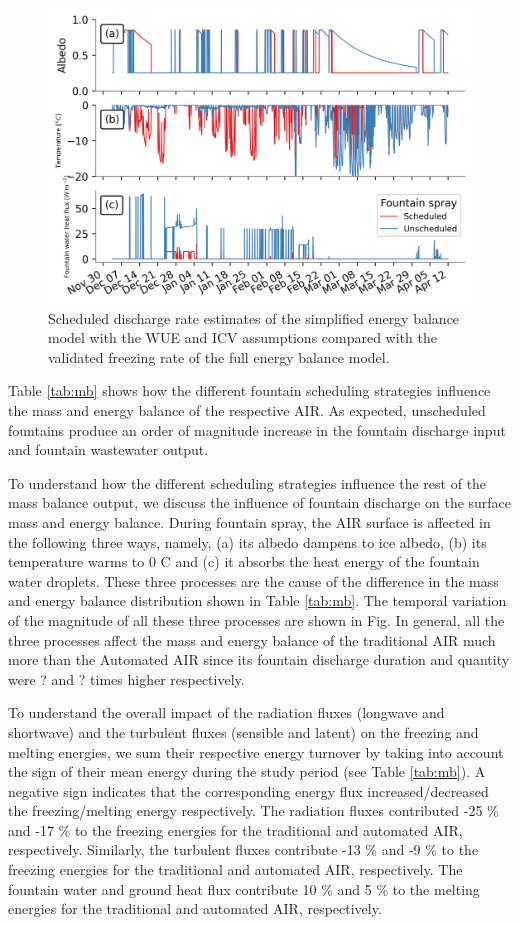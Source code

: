\documentclass[tc, manuscript]{copernicus}
\begin{document}
\begin{figure}[t]
\includegraphics[width=12cm]{Figures/dis_processes.png}
\caption{Scheduled discharge rate estimates of the simplified energy balance model with the WUE and ICV
assumptions compared with the validated freezing rate of the full energy balance model.}
\label{fig:freezing_rate}
\end{figure}

Table \ref{tab:mb} shows how the different fountain scheduling strategies influence the mass
and energy balance of the respective AIR. As expected, unscheduled fountains produce an order of magnitude
increase in the fountain discharge input and fountain wastewater output. 

To understand how the different scheduling strategies influence the rest of the mass balance output, we discuss
the influence of fountain discharge on the surface mass and energy balance. During fountain spray, the AIR
surface is affected in the following three ways, namely, (a) its albedo dampens to ice albedo, (b) its
temperature warms to 0 C and (c) it absorbs the heat energy of the fountain water droplets. These three
processes are the cause of the difference in the mass and energy balance distribution shown in Table
\ref{tab:mb}. The temporal variation of the magnitude of all these three processes are shown in Fig. In general,
all the three processes affect the mass and energy balance of the traditional AIR much more than the Automated
AIR since its fountain discharge duration and quantity were ? and ? times higher respectively. 

To understand the overall impact of the radiation fluxes (longwave and shortwave) and the turbulent fluxes
(sensible and latent) on the freezing and melting energies, we sum their respective energy turnover by taking
into account the sign of their mean energy during the study period (see Table \ref{tab:mb}). A negative sign
indicates that the corresponding energy flux increased/decreased the freezing/melting energy respectively.  The
radiation fluxes contributed -25 \% and -17 \% to the freezing energies for the traditional and automated AIR,
respectively.  Similarly, the turbulent fluxes contribute -13 \% and -9 \% to the freezing energies for the
traditional and automated AIR, respectively. The fountain water and ground heat flux contribute 10 \% and 5 \%
to the melting energies for the traditional and automated AIR, respectively. 
\end{document}
